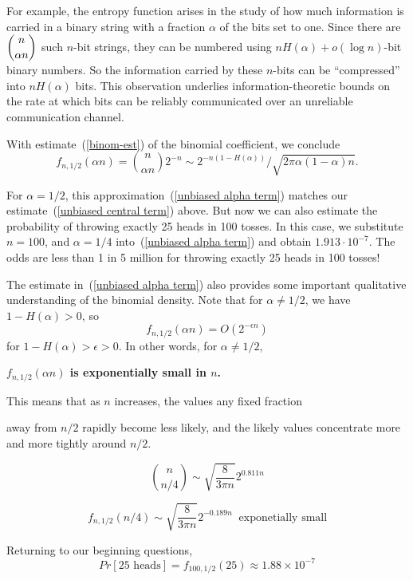 \documentclass[11pt,twoside]{article}
\begin{document}
For example, the entropy function arises in the study of how much
information is carried in a binary string with a fraction $\alpha$ of the
bits set to one.  Since there are $\dbinom{n}{\alpha n}$ such $n$-bit
strings, they can be numbered using $nH(\alpha) + o(\log n)$-bit binary
numbers.  So the information carried by these $n$-bits can be
``compressed'' into $nH(\alpha)$ bits.  This observation underlies
information-theoretic bounds on the rate at which bits can be reliably
communicated over an unreliable communication channel.

With estimate~(\ref{binom-est}) of the binomial coefficient, we conclude
\begin{equation}\label{unbiased alpha term}
f_{n,1/2}(\alpha n) = \binom{n}{\alpha n}2^{-n} \sim
2^{-n(1 - H(\alpha))}/\sqrt{2\pi \alpha(1-\alpha)n}.
\end{equation}

For $\alpha = 1/2$, this approximation~(\ref{unbiased alpha term}) matches
our estimate~(\ref{unbiased central term}) above.  But now we can also
estimate the probability of throwing exactly 25 heads in 100 tosses.  In
this case, we substitute $n = 100$, and $\alpha = 1/4$ into~(\ref{unbiased
alpha term}) and obtain $1.913 \cdot 10^{-7}$.  The odds are less than 1
in 5 million for throwing exactly 25 heads in 100 tosses!

The estimate in~(\ref{unbiased alpha term}) also provides some important
qualitative understanding of the binomial density.  Note that for
$\alpha \neq 1/2$, we have $1- H(\alpha) > 0$, so
\[
f_{n,1/2}(\alpha n) = O(2^{-\epsilon n})
\]
for $ 1 - H(\alpha) > \epsilon > 0$.  In other words, for $\alpha \neq 1/2$,
\begin{center}
\textbf{$f_{n,1/2}(\alpha n)$ is exponentially small in $n$.}
\end{center}
This means that as $n$ increases, the values any fixed fraction

away from $n/2$ rapidly become less likely, and the likely values
concentrate more and more tightly around $n/2$.

\iffalse

\begin{example}

\[
\binom{n}{n/4} \sim \sqrt{\frac{8}{3\pi n}}2^{0.811n}
\]

$$ f_{n,1/2}(n/4) \sim \sqrt{\frac{8}{3\pi n}}2^{-0.189n} \;\;
\text{exponetially small} $$

Returning to our beginning questions, 
$$ Pr[\mbox{25 heads}] = f_{100,1/2}(25) \approx 1.88 \times 10^{-7} $$

\end{example}
\end{document}
